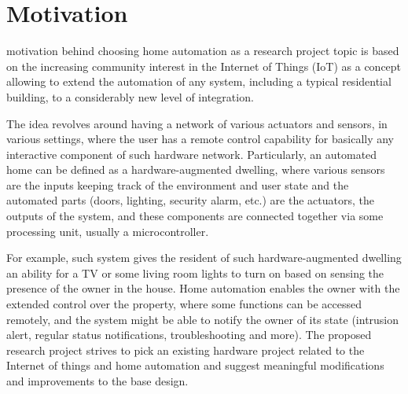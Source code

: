 \documentclass[journal]{IEEEtran}
\begin{document}
\section{Motivation}

%
 motivation behind choosing home automation as a research project topic is based on the increasing community interest in the Internet of Things (IoT) as a concept allowing to extend the automation of any system, including a typical residential building, to a considerably new level of integration.

The idea revolves around having a network of various actuators and sensors, in various settings, where the user has a remote control capability for basically any interactive component of such hardware network. Particularly, an automated home can be defined as a hardware-augmented dwelling, where various sensors are the inputs keeping track of the environment and user state and the automated parts (doors, lighting, security alarm, etc.) are the actuators, the outputs of the system, and these components are connected together via some processing unit, usually a microcontroller.

For example, such system gives the resident of such hardware-augmented dwelling an ability for a TV or some living room lights to turn on based on sensing the presence of the owner in the house. Home automation enables the owner with the extended control over the property, where some functions can be accessed remotely, and the system might be able to notify the owner of its state (intrusion alert, regular status notifications, troubleshooting and more). The proposed research project strives to pick an existing hardware project related to the Internet of things and home automation and suggest meaningful modifications and improvements to the base design.

\end{document}
